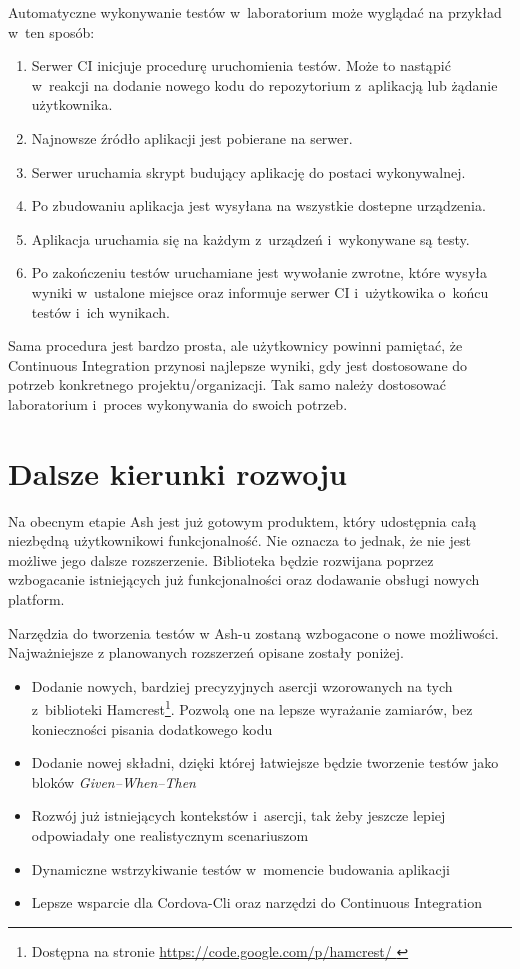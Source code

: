 \documentclass[brudnopis]{xmgr}
\begin{document}
Automatyczne wykonywanie testów w~laboratorium może wyglądać na przykład w~ten sposób:

\begin{enumerate}
  \item Serwer CI inicjuje procedurę uruchomienia testów. Może to nastąpić w~reakcji na dodanie nowego kodu do repozytorium z~aplikacją lub żądanie użytkownika.
  \item Najnowsze źródło aplikacji jest pobierane na serwer.
  \item Serwer uruchamia skrypt budujący aplikację do postaci wykonywalnej.
  \item Po zbudowaniu aplikacja jest wysyłana na wszystkie dostepne urządzenia.
  \item Aplikacja uruchamia się na każdym z~urządzeń i~wykonywane są testy.
  \item Po zakończeniu testów uruchamiane jest wywołanie zwrotne, które wysyła wyniki w~ustalone miejsce oraz informuje serwer CI i~użytkowika o~końcu testów i~ich wynikach.
\end{enumerate}

Sama procedura jest bardzo prosta, ale użytkownicy powinni pamiętać, że Continuous Integration przynosi najlepsze wyniki, gdy jest dostosowane do potrzeb konkretnego projektu/organizacji. Tak samo należy dostosować laboratorium i~proces wykonywania do swoich potrzeb. 

\chapter{Dalsze kierunki rozwoju}

Na obecnym etapie Ash jest już gotowym produktem, który udostępnia całą niezbędną użytkownikowi funkcjonalność. Nie oznacza to jednak, że nie jest możliwe jego dalsze rozszerzenie. Biblioteka będzie rozwijana poprzez wzbogacanie istniejących już funkcjonalności oraz dodawanie obsługi nowych platform. 

Narzędzia do tworzenia testów w Ash-u zostaną wzbogacone o nowe możliwości. Najważniejsze z planowanych rozszerzeń opisane zostały poniżej.

\begin{itemize}
  \item Dodanie nowych, bardziej precyzyjnych asercji wzorowanych na tych z~biblioteki Hamcrest\footnote{Dostępna na stronie \url{https://code.google.com/p/hamcrest/ } }. Pozwolą one na lepsze wyrażanie zamiarów, bez konieczności pisania dodatkowego kodu
  \item Dodanie nowej składni, dzięki której łatwiejsze będzie tworzenie testów jako bloków \textit{Given--When--Then}
  \item Rozwój już istniejących kontekstów i~asercji, tak żeby jeszcze lepiej odpowiadały one realistycznym scenariuszom 
  \item Dynamiczne wstrzykiwanie testów w~momencie budowania aplikacji
  \item Lepsze wsparcie dla Cordova-Cli oraz narzędzi do Continuous Integration
\end{itemize}
\end{document}
